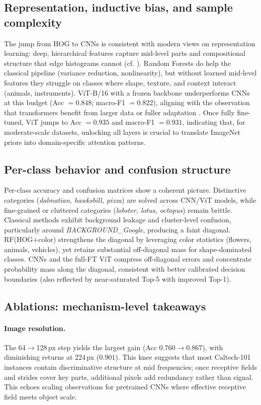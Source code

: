 \documentclass[11pt]{article}
\begin{document}
\subsection{Representation, inductive bias, and sample complexity}
The jump from HOG to CNNs is consistent with modern views on representation learning: deep, hierarchical features capture mid-level parts and compositional structure that edge histograms cannot (cf. \cite{He2016,Tan2019}). Random Forests do help the classical pipeline (variance reduction, nonlinearity), but without learned mid-level features they struggle on classes where shape, texture, and context interact (animals, instruments). ViT-B/16 with a frozen backbone underperforms CNNs at this budget (Acc $=0.848$; macro-F1 $=0.822$), aligning with the observation that transformers benefit from larger data or fuller adaptation \cite{Dosovitskiy2021}. Once fully fine-tuned, ViT jumps to Acc $=0.935$ and macro-F1 $=0.931$, indicating that, for moderate-scale datasets, unlocking all layers is crucial to translate ImageNet priors into domain-specific attention patterns.

\subsection{Per-class behavior and confusion structure}
Per-class accuracy and confusion matrices show a coherent picture. Distinctive categories (\emph{dalmatian, hawksbill, pizza}) are solved across CNN/ViT models, while fine-grained or cluttered categories (\emph{lobster, lotus, octopus}) remain brittle. Classical methods exhibit background leakage and cluster-level confusion, particularly around \emph{BACKGROUND\_Google}, producing a faint diagonal. RF(HOG+color) strengthens the diagonal by leveraging color statistics (flowers, animals, vehicles), yet retains substantial off-diagonal mass for shape-dominated classes. CNNs and the full-FT ViT compress off-diagonal errors and concentrate probability mass along the diagonal, consistent with better calibrated decision boundaries (also reflected by near-saturated Top-5 with improved Top-1).

\subsection{Ablations: mechanism-level takeaways}
\paragraph{Image resolution.} The 64$\to$128\,px step yields the largest gain (Acc $0.760\to0.867$), with diminishing returns at 224\,px ($0.901$). This knee suggests that most Caltech-101 instances contain discriminative structure at mid frequencies; once receptive fields and strides cover key parts, additional pixels add redundancy rather than signal. This echoes scaling observations for pretrained CNNs where effective receptive field meets object scale.
\end{document}
